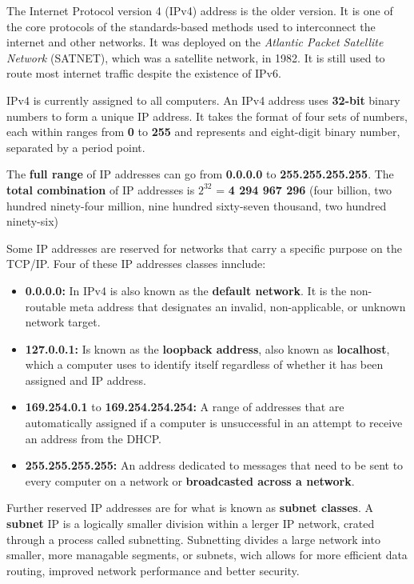 The Internet Protocol version 4 (IPv4) address is the older version. It is one of the core protocols of the standards-based methods used to interconnect the internet and other networks. It was deployed on the \textit{Atlantic Packet Satellite Network} (SATNET), which was a satellite network, in 1982. It is still used to route most internet traffic despite the existence of IPv6.

IPv4 is currently assigned to all computers. An IPv4 address uses \textbf{32-bit} binary numbers to form a unique IP address. It takes the format of four sets of numbers, each within ranges from \textbf{0} to \textbf{255} and represents and eight-digit binary number, separated by a period point.

The \textbf{full range} of IP addresses can go from \textbf{0.0.0.0} to \textbf{255.255.255.255}. The \textbf{total combination} of IP addresses is $2^{32}$ = \textbf{4 294 967 296} (four billion, two hundred ninety-four million, nine hundred sixty-seven thousand, two hundred ninety-six)

Some IP addresses are reserved for networks that carry a specific purpose on the TCP/IP. Four of these IP addresses classes innclude:

\begin{itemize}
  \item \textbf{0.0.0.0:} In IPv4 is also known as the \textbf{default network}. It is the non-routable meta address that designates an invalid, non-applicable, or unknown network target.
  \item \textbf{127.0.0.1:} Is known as the \textbf{loopback address}, also known as \textbf{localhost}, which a computer uses to identify itself regardless of whether it has been assigned and IP address.
  \item \textbf{169.254.0.1} to \textbf{169.254.254.254:} A range of addresses that are automatically assigned if a computer is unsuccessful in an attempt to receive an address from the DHCP.
  \item \textbf{255.255.255.255:} An address dedicated to messages that need to be sent to every computer on a network or \textbf{broadcasted across a network}.
\end{itemize}

Further reserved IP addresses are for what is known as \textbf{subnet classes}. A \textbf{subnet} IP is a logically smaller division within a lerger IP network, crated through a process called subnetting. Subnetting divides a large network into smaller, more managable segments, or subnets, wich allows for more efficient data routing, improved network performance and better security.

